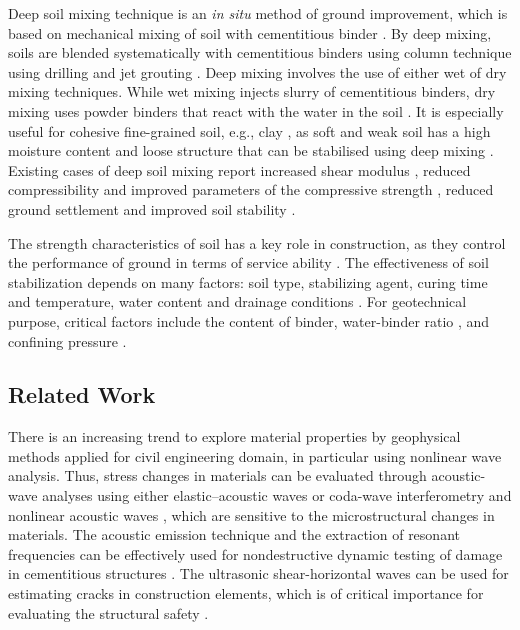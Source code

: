 \documentclass[USenglish,twocolumn]{article}
\begin{document}
Deep soil mixing technique is an \emph{in situ} method of ground improvement, which is based on mechanical mixing of soil with cementitious binder \cite{Kitazume,PorbahaetalA}. By deep mixing, soils are blended systematically with cementitious binders using column technique using drilling and jet grouting \cite{Larssonetal2015,Larsson}. Deep mixing involves the use of either wet of dry mixing techniques. While wet mixing injects slurry of cementitious binders, dry mixing uses powder binders that react with the water in the soil \cite{PorbahaetalB}. It is especially useful for cohesive fine-grained soil, e.g., clay \cite{Dahlstroem,Xieetal2012}, as soft and weak soil has a high moisture content and loose structure that can be stabilised using deep mixing \cite{PorbahaetalC}. Existing cases of deep soil mixing report increased shear modulus \cite{Fangetal2001}, reduced compressibility and improved parameters of the compressive strength \cite{Mypati}, reduced ground settlement and improved soil stability \cite{Bergado}.

The strength characteristics of soil has a key role in construction, as they control the performance of ground in terms of service ability \cite{Munfakh}. The effectiveness of soil stabilization depends on many factors: soil type, stabilizing agent, curing time and temperature, water content and drainage conditions \cite{Winterkorn1991b}. For geotechnical purpose, critical factors include the content of binder, water-binder ratio \cite{Robertson,Zhang,Yangetal2010}, and confining pressure \cite{Rabbi,Xuetal2022,Huangetal2022}. 

\subsection{Related Work} 

There is an increasing trend to explore material properties by geophysical methods applied for civil engineering domain, in particular using nonlinear wave analysis. Thus, stress changes in materials can be evaluated through acoustic-wave analyses using either elastic–acoustic waves  \cite{Jiangetal2017} or coda-wave interferometry and nonlinear acoustic waves \cite{Jiangetal2021}, which are sensitive to the microstructural changes in materials. The acoustic emission technique and the extraction of resonant frequencies can be effectively used for nondestructive dynamic testing of damage in cementitious structures \cite{Lacidogna}. The ultrasonic shear-horizontal waves can be used for estimating cracks in construction elements, which is of critical importance for evaluating the structural safety \cite{LinWang}.
\end{document}
